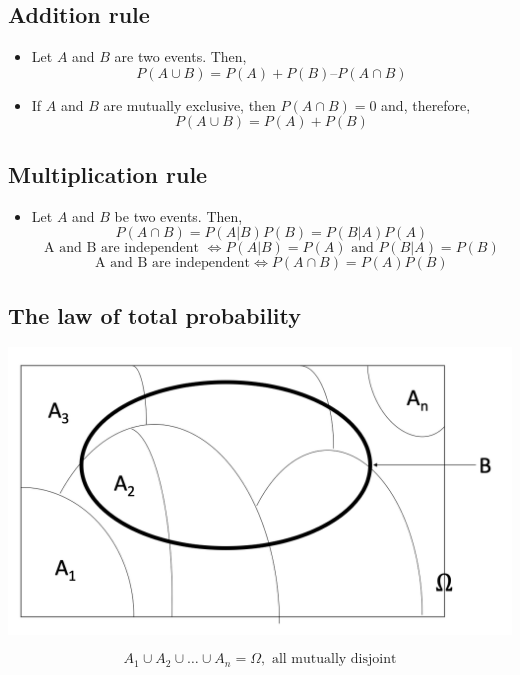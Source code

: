 \documentclass[]{book}
\providecommand{\tightlist}{%
  \setlength{\itemsep}{0pt}\setlength{\parskip}{0pt}}
\begin{document}
\hypertarget{addition-rule}{%
\subsection{Addition rule}\label{addition-rule}}

\begin{itemize}
\tightlist
\item
  Let \(A\) and \(B\) are two events. Then,
  \[P(A \cup B) = P(A) + P(B) – P(A \cap B)\]
\item
  If \(A\) and \(B\) are mutually exclusive, then \(P(A \cap B) = 0\) and, therefore,
  \[P(A \cup B) = P(A) + P(B)\]
\end{itemize}

\hypertarget{multiplication-rule}{%
\subsection{Multiplication rule}\label{multiplication-rule}}

\begin{itemize}
\tightlist
\item
  Let \(A\) and \(B\) be two events. Then,
  \[P(A \cap B) = P(A|B)P(B) = P(B|A)P(A)\]
  \[\text{A and B are independent } \iff P(A|B) = P(A) \text{ and } P(B|A) = P(B)\]
  \[\text{A and B are independent} \iff P(A \cap B) = P(A) P(B)\]
\end{itemize}

\hypertarget{the-law-of-total-probability}{%
\subsection{The law of total probability}\label{the-law-of-total-probability}}

\begin{center}\includegraphics[width=0.7\linewidth]{figure/totprob} \end{center}

\[A_1\cup A_2\cup \dots \cup A_n = \Omega, \text{ all mutually disjoint}\]
\end{document}
